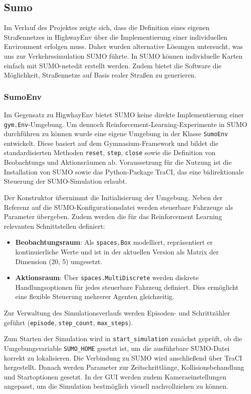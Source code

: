 \subsection{Sumo}
Im Verlauf des Projektes zeigte sich, dass die Definition eines eigenen Straßennetzes in HighwayEnv über die Implementierung einer individuellen Environment erfolgen muss. Daher wurden alternative Lösungen untersucht, was uns zur Verkehrssimulation SUMO führte. In SUMO können individuelle Karten einfach mit SUMO-netedit erstellt werden. Zudem bietet die Software die Möglichkeit, Straßennetze auf Basis realer Straßen zu generieren.
\subsubsection{SumoEnv}
Im Gegensatz zu HigwhayEnv bietet SUMO keine direkte Implementierung einer \texttt{gym.Env}-Umgebung. Um dennoch Reinforcement-Learning-Experimente in SUMO durchführen zu können wurde eine eigene Umgebung in der Klasse \texttt{SumoEnv} entwickelt. Diese basiert auf dem Gymnasium-Framework und bildet die standardisierten Methoden \texttt{reset}, \texttt{step}, \texttt{close} sowie die Definition von Beobachtungs und Aktionsräumen ab. Voraussetzung für die Nutzung ist die Installation von SUMO sowie das Python-Package TraCI, das eine bidirektionale Steuerung der SUMO-Simulation erlaubt.

Der Konstruktor übernimmt die Initialisierung der Umgebung. Neben der Referenz auf die SUMO-Konfigurationsdatei werden steuerbare Fahrzeuge als Parameter übergeben. Zudem werden die für das Reinforcement Learning relevanten Schnittstellen definiert:
\begin{itemize}
    \item \textbf{Beobachtungsraum}: Als \texttt{spaces.Box} modelliert, repräsentiert er kontinuierliche Werte und ist in der aktuellen Version als Matrix der Dimension (20, 5) umgesetzt.
    \item \textbf{Aktionsraum}: Über \texttt{spaces.MultiDiscrete} werden diskrete Handlungsoptionen für jedes steuerbare Fahrzeug definiert. Dies ermöglicht eine flexible Steuerung mehrerer Agenten gleichzeitig.
\end{itemize}
Zur Verwaltung des Simulationsverlaufs werden Episoden- und Schrittzähler geführt (\texttt{episode}, \texttt{step\_count}, \texttt{max\_steps}).

Zum Starten der Simulation wird in \texttt{start\_simulation} zunächst geprüft, ob die Umgebungsvariable \texttt{SUMO\_HOME} gesetzt ist, um die ausführbare SUMO-Datei korrekt zu lokalisieren. Die Verbindung zu SUMO wird anschließend über TraCI hergestellt. Danach werden Parameter zur Zeitschrittlänge, Kollisionsbehandlung und Startoptionen gesetzt. In der GUI werden zudem Kameraeinstellungen angepasst, um die Simulation bestmöglich visuell nachvollziehen zu können.

